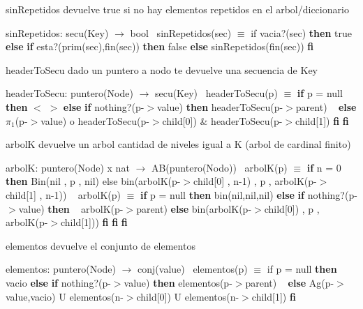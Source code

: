 \begin{DoxyParagraph}{sin\+Repetidos}
devuelve true si no hay elementos repetidos en el arbol/diccionario

sin\+Repetidos\+: secu(\+Key) $\to$ bool~\newline
 sin\+Repetidos(sec) $\equiv$ if vacia?(sec) {\bfseries then} true {\bfseries else} {\bfseries if} esta?(prim(sec),fin(sec)) {\bfseries then} false {\bfseries else} sin\+Repetidos(fin(sec)) {\bfseries fi} 
\end{DoxyParagraph}


\begin{DoxyParagraph}{header\+To\+Secu}
dado un puntero a nodo te devuelve una secuencia de Key

header\+To\+Secu\+: puntero(\+Node) $\to$ secu(\+Key)~\newline
 header\+To\+Secu(p) $\equiv$ {\bfseries if} p = null {\bfseries then} $<$ $>$ {\bfseries else} {\bfseries if} nothing?(p-\/$>$value) {\bfseries then} header\+To\+Secu(p-\/$>$parent) ~\newline
 {\bfseries else} $\pi_1$(p-\/$>$value) o header\+To\+Secu(p-\/$>$child\mbox{[}0\mbox{]}) \& header\+To\+Secu(p-\/$>$child\mbox{[}1\mbox{]}) {\bfseries fi} {\bfseries fi} 
\end{DoxyParagraph}


\begin{DoxyParagraph}{arbolK}
devuelve un arbol cantidad de niveles igual a K (arbol de cardinal finito)

arbolK\+: puntero(\+Node) x nat $\to$ A\+B(puntero(\+Nodo))~\newline
 arbol\+K(p) $\equiv$ {\bfseries if} n = 0 {\bfseries then} Bin(nil , p , nil) else bin(arbolK(p-\/$>$child\mbox{[}0\mbox{]} , n-\/1) , p , arbolK(p-\/$>$child\mbox{[}1\mbox{]} , n-\/1)) ~\newline
 arbol\+K(p) $\equiv$ {\bfseries if} p = null {\bfseries then} bin(nil,nil,nil) {\bfseries else} {\bfseries if} nothing?(p-\/$>$value) {\bfseries then} ~\newline
 arbolK(p-\/$>$parent) {\bfseries else} bin(arbolK(p-\/$>$child\mbox{[}0\mbox{]}) , p , arbolK(p-\/$>$child\mbox{[}1\mbox{]})) {\bfseries fi} {\bfseries fi} {\bfseries fi} 
\end{DoxyParagraph}


\begin{DoxyParagraph}{elementos}
devuelve el conjunto de elementos

elementos\+: puntero(\+Node) $\to$ conj(value)~\newline
 elementos(p) $\equiv$ if p = null {\bfseries then} vacio {\bfseries else} {\bfseries if} nothing?(p-\/$>$value) {\bfseries then} elementos(p-\/$>$parent) ~\newline
 {\bfseries else} Ag(p-\/$>$value,vacio) U elementos(n-\/$>$child\mbox{[}0\mbox{]}) U elementos(n-\/$>$child\mbox{[}1\mbox{]}) {\bfseries fi} 
\end{DoxyParagraph}


